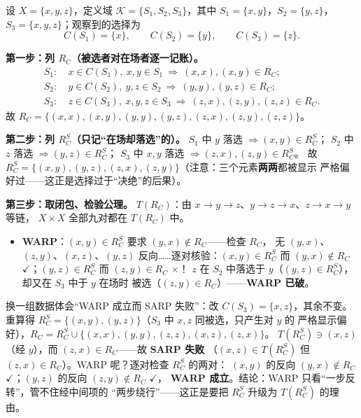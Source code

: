\begin{example}\label{ex:workedRC}
设 $X=\{x,y,z\}$，定义域 $\mathcal{K}=\{S_1,S_2,S_3\}$，其中
$S_1=\{x,y\}$，$S_2=\{y,z\}$，$S_3=\{x,y,z\}$；观察到的选择为
\[
C(S_1)=\{x\},\qquad C(S_2)=\{y\},\qquad C(S_3)=\{z\}.
\]

\textbf{第一步：列 $R_C$（被选者对在场者逐一记账）。}
\begin{align*}
S_1:&\ x\in C(S_1),\ x,y\in S_1 \ \Rightarrow\ (x,x),(x,y)\in R_C;\\
S_2:&\ y\in C(S_2),\ y,z\in S_2 \ \Rightarrow\ (y,y),(y,z)\in R_C;\\
S_3:&\ z\in C(S_3),\ x,y,z\in S_3 \ \Rightarrow\ (z,x),(z,y),(z,z)\in R_C.
\end{align*}
故 $R_C=\{(x,x),(x,y),(y,y),(y,z),(z,x),(z,y),(z,z)\}$。

\textbf{第二步：列 $R_C^S$（只记“在场却落选”的）。}
$S_1$ 中 $y$ 落选 $\Rightarrow (x,y)\in R_C^S$；
$S_2$ 中 $z$ 落选 $\Rightarrow (y,z)\in R_C^S$；
$S_3$ 中 $x,y$ 落选 $\Rightarrow (z,x),(z,y)\in R_C^S$。
故 $R_C^S=\{(x,y),(y,z),(z,x),(z,y)\}$（注意：三个元素\textbf{两两}都被显示
严格偏好过——这正是选择过于“决绝”的后果）。

\textbf{第三步：取闭包、检验公理。}
$T(R_C)$：由 $x\to y\to z$、$y\to z\to x$、$z\to x\to y$ 等链，
$X\times X$ 全部九对都在 $T(R_C)$ 中。
\begin{itemize}
  \item \textbf{WARP}：$(x,y)\in R_C^S$ 要求 $(y,x)\notin R_C$——检查 $R_C$，
  无 $(y,x)$、$(z,y)$、$(x,z)$、$(y,z)$ 反向……逐对核验：$(x,y)\in R_C^S$
  而 $(y,x)\notin R_C$ $\checkmark$；$(y,z)\in R_C^S$ 而 $(z,y)\in R_C$ $\times$！
  $z$ 在 $S_2$ 中落选于 $y$（$(y,z)\in R_C^S$），却又在 $S_3$ 中于 $y$ 在场时
  被选（$(z,y)\in R_C$）——\textbf{WARP 已破}。
\end{itemize}
换一组数据体会“WARP 成立而 SARP 失败”：改 $C(S_3)=\{x,z\}$，其余不变。
重算得 $R_C^S=\{(x,y),(y,z)\}$（$S_3$ 中 $x,z$ 同被选，只产生对 $y$ 的
严格显示偏好），$R_C=R_C^S\cup\{(x,x),(y,y),(z,z),(x,z),(z,x)\}$。
$T(R_C^S)\ni (x,z)$（经 $y$），而 $(z,x)\in R_C$——故 \textbf{SARP 失败}
（$(x,z)\in T(R_C^S)$ 但 $(z,x)\in R_C$）。WARP 呢？逐对检查 $R_C^S$ 的两对：
$(x,y)$ 的反向 $(y,x)\notin R_C$ $\checkmark$；$(y,z)$ 的反向 $(z,y)\notin R_C$ $\checkmark$，
\textbf{WARP 成立}。结论：WARP 只看“一步反转”，管不住经中间项的
“两步绕行”——这正是要把 $R_C^S$ 升级为 $T(R_C^S)$ 的理由。
\end{example}

